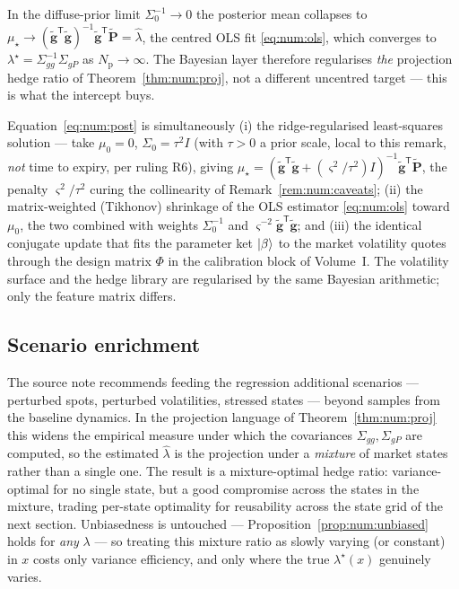 In the diffuse-prior limit $\Sigma_0^{-1}\to 0$ the posterior mean collapses to
$\mu_\star \to (\tilde{\mathbf g}^{\mathsf T}\tilde{\mathbf g})^{-1}
\tilde{\mathbf g}^{\mathsf T}\tilde{\mathbf P} = \hat\lambda$, the centred OLS fit
\eqref{eq:num:ols}, which converges to $\lambda^\star = \Sigma_{gg}^{-1}\Sigma_{gP}$
as $N_{\mathrm{p}}\to\infty$. The Bayesian layer therefore regularises \emph{the}
projection hedge ratio of Theorem~\ref{thm:num:proj}, not a different uncentred
target --- this is what the intercept buys.

\begin{remark}\label{rem:num:threereadings}
Equation~\eqref{eq:num:post} is simultaneously (i) the ridge-regularised
least-squares solution --- take $\mu_0 = 0$, $\Sigma_0 = \tau^2 I$ (with
$\tau > 0$ a prior scale, local to this remark, \emph{not} time to expiry, per
ruling R6), giving $\mu_\star = (\tilde{\mathbf g}^{\mathsf T}\tilde{\mathbf g}
+ (\varsigma^2/\tau^2) I)^{-1}\tilde{\mathbf g}^{\mathsf T}\tilde{\mathbf P}$, the
penalty $\varsigma^2/\tau^2$ curing the collinearity of
Remark~\ref{rem:num:caveats}; (ii) the matrix-weighted (Tikhonov) shrinkage of
the OLS estimator \eqref{eq:num:ols} toward $\mu_0$, the two combined with
weights $\Sigma_0^{-1}$ and $\varsigma^{-2}\tilde{\mathbf g}^{\mathsf T}\tilde{\mathbf g}$;
and (iii) the identical conjugate update that fits the parameter ket $\mathinner{\lvert \beta \rangle}$ to
the market volatility quotes through the design matrix $\Phi$ in the calibration
block of Volume~I. The volatility surface and the hedge library are regularised
by the same Bayesian arithmetic; only the feature matrix differs.
\end{remark}

\subsection{Scenario enrichment}

The source note recommends feeding the regression additional scenarios ---
perturbed spots, perturbed volatilities, stressed states --- beyond samples from
the baseline dynamics. In the projection language of
Theorem~\ref{thm:num:proj} this widens the empirical measure under which the
covariances $\Sigma_{gg}, \Sigma_{gP}$ are computed, so the estimated
$\hat\lambda$ is the projection under a \emph{mixture} of market states rather
than a single one. The result is a mixture-optimal hedge ratio: variance-optimal
for no single state, but a good compromise across the states in the mixture,
trading per-state optimality for reusability across the state grid of the next
section. Unbiasedness is untouched --- Proposition~\ref{prop:num:unbiased} holds
for \emph{any} $\lambda$ --- so treating this mixture ratio as slowly varying (or
constant) in $x$ costs only variance efficiency, and only where the true
$\lambda^\star(x)$ genuinely varies.


